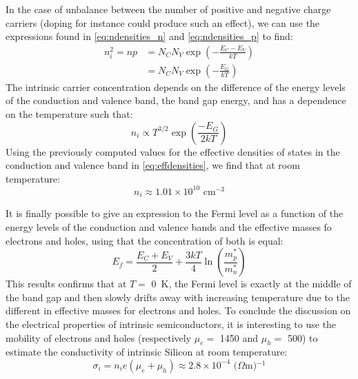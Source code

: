 		In the case of unbalance between the number of positive and negative charge carriers (doping for instance could produce such an effect), we can use the expressions found in \eqref{eq:ndensities_n} and \eqref{eq:ndensities_p} to find: 
		\begin{equation}
			\begin{split}
				n_i^2 = np 	& = N_C N_V \exp(-\frac{E_C-E_V}{kT})\\
										& = N_C N_V \exp(-\frac{E_G}{kT})
			\end{split}
		\end{equation}
		The intrinsic carrier concentration depends on the difference of the energy levels of the conduction and valence band, the band gap energy, and has a dependence on the temperature such that: 
		\begin{equation}
			n_i \propto T^{3/2} \exp(\frac{-E_G}{2kT})
		\end{equation}
		Using the previously computed values for the effective densities of states in the conduction and valence band in \ref{eq:effdensities}, we find that at room temperature: 
		\begin{equation}
			n_i \approx 1.01 \times 10^{10} \text{ cm$^{-3}$}
		\end{equation}

		It is finally possible to give an expression to the Fermi level as a function of the energy levels of the conduction and valence bands and the effective masses fo electrons and holes, using that the concentration of both is equal: 
		\begin{equation}
			E_f = \frac{E_C + E_V}{2} + \frac{3kT}{4} \ln(\frac{m_p^*}{m_n^*})
		\end{equation}
		This results confirms that at $T =$ \SI{0}{\kelvin}, the Fermi level is exactly at the middle of the band gap and then slowly drifts away with increasing temperature due to the different in effective masses for electrons and holes. 
		To conclude the discussion on the electrical properties of intrinsic semiconductors, it is interesting to use the mobility of electrons and holes (respectively $\mu_e = $ \SI{1450}{\frac{\centi\meter\squared}{\volt\second}} and $\mu_h = $ \SI{500}{\frac{\centi\meter\squared}{\volt\second}}) to estimate the conductivity of intrinsic Silicon at room temperature: 
		\begin{equation}
			\sigma_i = n_i e {\left( \mu_e + \mu_h \right)} \approx 2.8 \times 10^{-4} \text{ ($\Omega$m)$^{-1}$}
		\end{equation}

